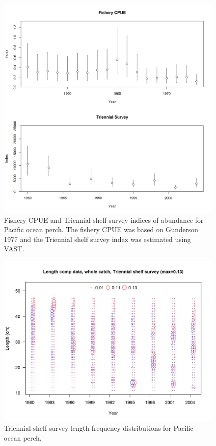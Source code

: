 \documentclass[12pt,]{article}
\begin{document}
\FloatBarrier

\begin{figure}
\centering
\includegraphics{Figures/Index_Data_2.png}
\caption{Fishery CPUE and Triennial shelf survey indices of abundance
for Pacific ocean perch. The fishery CPUE was based on Gunderson 1977
and the Triennial shelf survey index was estimated using VAST.
\label{fig:Excluded_Indices}}
\end{figure}

\FloatBarrier

\begin{figure}
\centering
\includegraphics{r4ss/plots_mod1/comp_lendat_bubflt5mkt0.png}
\caption{Triennial shelf survey length frequency distributions for
Pacific ocean perch. \label{fig:Tri_Length}}
\end{figure}
\end{document}
